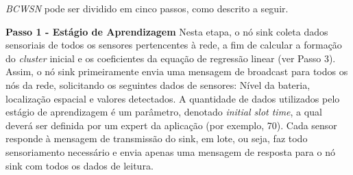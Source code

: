 \documentclass{acm_proc_article-sp}
\begin{document}



{\it BCWSN} pode ser dividido em cinco passos, como descrito a seguir. 
\vspace*{-.3cm}

{\bf Passo 1 - Estágio de Aprendizagem}
Nesta etapa, o nó sink coleta dados sensoriais de todos os sensores
{pertencentes à rede}, a fim de calcular a formação do {\it cluster} inicial e
os coeficientes da equação de regressão linear (ver Passo 3). Assim, o nó
sink primeiramente envia uma mensagem de broadcast para todos os nós da
rede, solicitando os seguintes dados de sensores: Nível da bateria, localização
espacial e valores detectados. A quantidade de dados utilizados pelo estágio de
aprendizagem é um parâmetro, denotado \textit{initial slot time}, a qual
deverá ser definida por um expert da aplicação (por exemplo, 70). Cada sensor
responde à mensagem de transmissão do sink, em lote, ou seja, faz todo
sensoriamento necessário e envia apenas uma mensagem de resposta para o nó sink
com todos os dados de leitura.
\vspace*{-.3cm}
\end{document}
